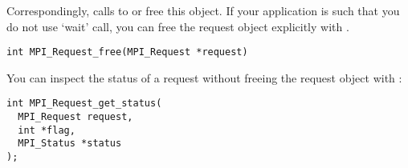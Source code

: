 Correspondingly, calls to  or 
free this object.
If your application is such that you do not use `wait' call, you can free the
request object explicitly
with .
\begin{lstlisting}
int MPI_Request_free(MPI_Request *request)
\end{lstlisting}

You can inspect the status of a request without freeing the request object
with :
\begin{lstlisting}
int MPI_Request_get_status(
  MPI_Request request,
  int *flag,
  MPI_Status *status
);
\end{lstlisting}

